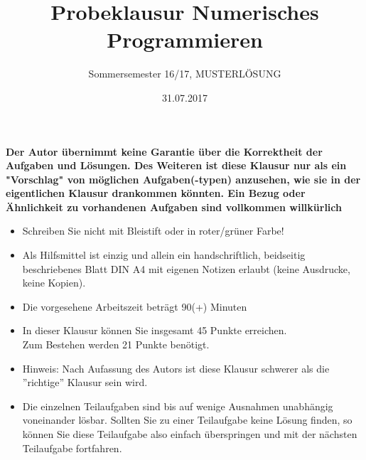 \documentclass{scrartcl}
\begin{document}
\title{Probeklausur Numerisches Programmieren}
\subtitle{Sommersemester 16/17, MUSTERLÖSUNG}
\author{\npauthor{}}
\date{31.07.2017}
\maketitle

\textbf{Der Autor übernimmt keine Garantie über die Korrektheit der Aufgaben und Lösungen. Des Weiteren ist diese Klausur nur als ein "Vorschlag" von möglichen Aufgaben(-typen) anzusehen, wie sie in der eigentlichen Klausur drankommen könnten. Ein Bezug oder Ähnlichkeit zu vorhandenen Aufgaben sind vollkommen willkürlich}
\sbreak

\begin{itemize}
	\item Schreiben Sie nicht mit Bleistift oder in roter/grüner Farbe!
	\item Als Hilfsmittel ist einzig und allein ein handschriftlich, beidseitig beschriebenes Blatt DIN A4 mit eigenen Notizen erlaubt (keine Ausdrucke, keine Kopien).
	\item Die vorgesehene Arbeitszeit beträgt 90(+) Minuten
	\item In dieser Klausur können Sie insgesamt 45 Punkte erreichen. \\Zum Bestehen werden 21 Punkte benötigt.
	\item Hinweis: Nach Aufassung des Autors ist diese Klausur schwerer als die ''richtige'' Klausur sein wird.
	\item Die einzelnen Teilaufgaben sind bis auf wenige Ausnahmen unabhängig voneinander lösbar.
	Sollten Sie zu einer Teilaufgabe keine Lösung finden, so können Sie diese Teilaufgabe also
	einfach überspringen und mit der nächsten Teilaufgabe fortfahren.
\end{itemize}
\end{document}
